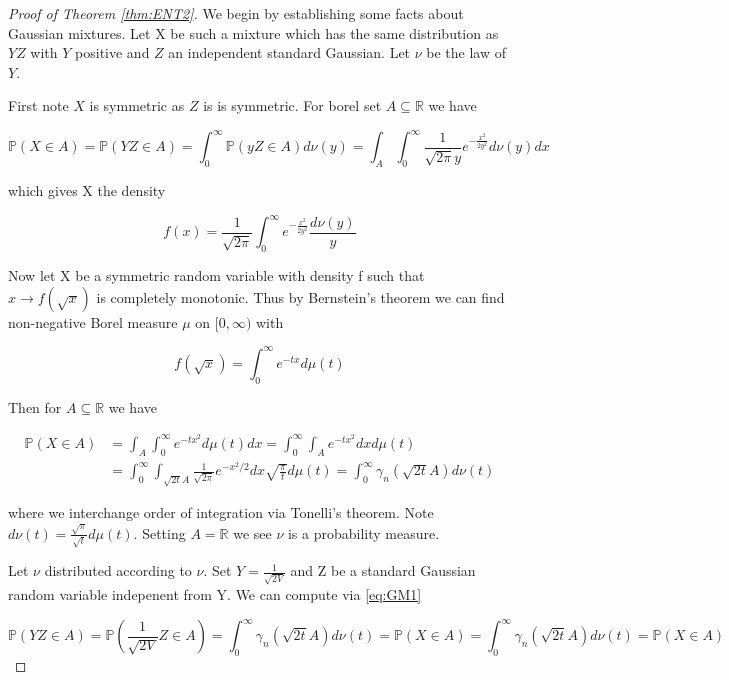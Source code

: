 \documentclass[10pt]{article}
\newcommand{\Pp}{\mathbb{P}}
\newcommand{\1}{\textbf{1}}
\newcommand{\R}{\mathbb{R}}
\theoremstyle{remark}
\theoremstyle{definition}
\begin{document}
\begin{proof}[Proof of Theorem \ref{thm:ENT2}]

We begin by establishing some facts about Gaussian mixtures. Let X be such a mixture which has the same distribution as $YZ$ with $Y$ positive and $Z$ an independent standard Gaussian. Let $\nu$ be the law of $Y$. 

First note $X$ is symmetric as $Z$ is is symmetric. For borel set $A \subseteq \R$ we have

\begin{equation}\label{eq:test}
	\Pp(X \in A) = \Pp(YZ \in A) = \int_0^{\infty}\Pp(yZ \in A)d\nu(y) = \int_A \int_0^{\infty}\frac{1}{\sqrt{2\pi}y}e^{-\frac{x^2}{2y^2}}d\nu(y)dx
\end{equation}

which gives X the density

\begin{equation}\label{eq:GM2}
	f(x) = \frac{1}{\sqrt{2\pi}}\int_0^{\infty}e^{-\frac{x^2}{2y^2}}\frac{d\nu(y)}{y}
\end{equation}

Now let X be a symmetric random variable with density f such that $x \to f(\sqrt{x})$ is completely monotonic. Thus by Bernstein's theorem we can find non-negative Borel measure $\mu$ on $[0,\infty)$ with

\begin{equation}
	f(\sqrt{x}) = \int_0^{\infty}e^{-tx}d\mu(t)
\end{equation}

Then for $A \subseteq \R$ we have

\begin{align}\label{eq:GM1}
	\Pp(X \in A) &= \int_A \int_0^{\infty} e^{-tx^2}d\mu(t)dx = \int_0^{\infty}\int_A e^{-tx^2}dxd\mu(t)\\
	&= \int_0^{\infty} \int_{\sqrt{2t}A} \frac{1}{\sqrt{2\pi}} e^{-x^2/2}dx\sqrt{\frac{\pi}{t}}d\mu(t) = \int_0^{\infty} \gamma_n(\sqrt{2t}A)d\nu(t)
\end{align}

where we interchange order of integration via Tonelli's theorem. Note $d\nu(t) = \frac{\sqrt{\pi}}{\sqrt{t}} d\mu(t)$. Setting $A = \R$ we see $\nu$ is a probability measure.

Let $\nu$ distributed according to $\nu$. Set $Y = \frac{1}{\sqrt{2V}}$ and Z be a standard Gaussian random variable indepenent from Y. We can compute via \ref{eq:GM1} 

\begin{equation*}
	\Pp(YZ \in A) = \Pp(\frac{1}{\sqrt{2V}}Z \in A) = \int_0^{\infty} \gamma_n(\sqrt{2t}A) d\nu(t) = \Pp(X \in A) = \int_0^{\infty} \gamma_n(\sqrt{2t}A) d\nu(t) = \Pp(X \in A)
\end{equation*}


\end{proof}
\end{document}
